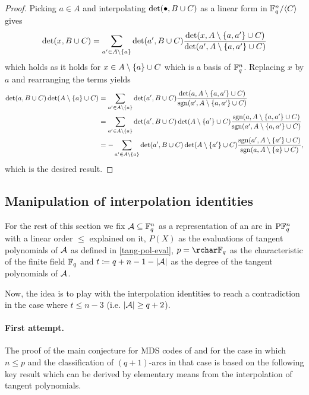 \begin{proof}
  Picking $a\in A$ and interpolating $\det(\bullet,B\cup C)$ as a linear form in
  $\field{q}^n/\gen C$ gives
  $$
  \det(x,B\setjoin C) 
  = \sum_{a'\in A\setminus\set a}{\det(a',B\setjoin C)\frac{\det(x,A\setminus\set{a,a'}\setjoin C)}{\det(a',A\setminus\set{a,a'}\setjoin C)}}
  $$
  which holds as it holds for $x\in A\setminus\set a\setjoin C$ which is a basis of $\mathbb{F}_{q}^n$. Replacing $x$ by $a$ and
  rearranging the terms yields
  \begin{align*}
    \det(a,B\setjoin C)\det(A\setminus\set a\setjoin C)
    &= 
    \sum_{a'\in A\setminus\set a}{\det(a',B\setjoin C)\frac{\det(a,A\setminus\set{a,a'}\setjoin C)}{\sgn(a',A\setminus\set{a,a'}\setjoin C)}}\\
    &= 
    \sum_{a'\in A\setminus\set a}{\det(a',B\setjoin C)\det(A\setminus\set {a'}\setjoin C)\frac{\sgn(a,A\setminus\set{a,a'}\setjoin C)}{\sgn(a',A\setminus\set{a,a'}\setjoin C)}}\\
    &= 
    -\sum_{a'\in A\setminus\set a}{\det(a',B\setjoin C)\det(A\setminus\set{a'}\setjoin C)\frac{\sgn(a',A\setminus\set{a'}\setjoin C)}{\sgn(a,A\setminus\set a\setjoin C)}},
  \end{align*}
  which is the desired result.
\end{proof}

\subsection{Manipulation of interpolation identities}

\begin{genassumptions}
For the rest of this section we fix $\mathcal{A}\subseteq\mathbb{F}_{q}^n$ as a representation of an arc in $\P \field{q}^n$ with a linear order $\leq$ explained on it, $P(X)$ as the evaluations of tangent polynomials of $\mathcal{A}$ as defined in \autoref{tang-pol-eval}, $p=\rchar \field{q}$ as the characteristic of the finite field $\mathbb{F}_{q}$ and $t\mathrel{\mathrel{\mathop:}\mkern-1.2mu=} q+n-1-\left\vert{\mathcal{A}}\right\vert$ as the degree of the tangent polynomials of $\mathcal{A}$.  
\end{genassumptions}

Now, the idea is to play with the interpolation identities to reach a
contradiction in the case where $t\leq n-3$ (i.e. $\left\vert{\mathcal{A}}\right\vert\geq q+2$).

\paragraph{First attempt.} The proof of the main conjecture for MDS codes of  and  for the case in which $n\leq p$ and the classification of $(q+1)$-arcs in that case is based on the following key result which can be derived by elementary means from the interpolation of tangent polynomials.

